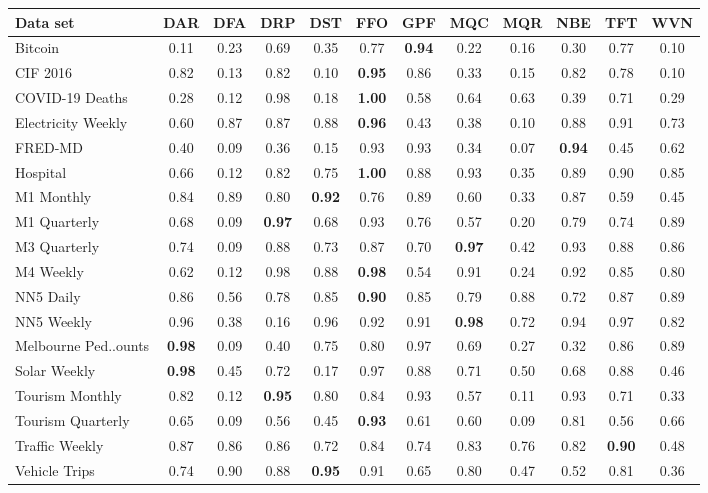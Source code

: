 
    \begin{tabular}{l|ccccccccccc}
        \toprule 
        Data set & DAR & DFA & DRP & DST & FFO & GPF & MQC & MQR & NBE & TFT & WVN \\
        \midrule
        Bitcoin & 0.11 & 0.23 & 0.69 & 0.35 & 0.77 & \textbf{0.94} & 0.22 & 0.16 & 0.30 & 0.77 & 0.10 \\
        CIF 2016 & 0.82 & 0.13 & 0.82 & 0.10 & \textbf{0.95} & 0.86 & 0.33 & 0.15 & 0.82 & 0.78 & 0.10 \\
        COVID-19 Deaths & 0.28 & 0.12 & 0.98 & 0.18 & \textbf{1.00} & 0.58 & 0.64 & 0.63 & 0.39 & 0.71 & 0.29 \\
        Electricity Weekly & 0.60 & 0.87 & 0.87 & 0.88 & \textbf{0.96} & 0.43 & 0.38 & 0.10 & 0.88 & 0.91 & 0.73 \\
        FRED-MD & 0.40 & 0.09 & 0.36 & 0.15 & 0.93 & 0.93 & 0.34 & 0.07 & \textbf{0.94} & 0.45 & 0.62 \\
        Hospital & 0.66 & 0.12 & 0.82 & 0.75 & \textbf{1.00} & 0.88 & 0.93 & 0.35 & 0.89 & 0.90 & 0.85 \\
        M1 Monthly & 0.84 & 0.89 & 0.80 & \textbf{0.92} & 0.76 & 0.89 & 0.60 & 0.33 & 0.87 & 0.59 & 0.45 \\
        M1 Quarterly & 0.68 & 0.09 & \textbf{0.97} & 0.68 & 0.93 & 0.76 & 0.57 & 0.20 & 0.79 & 0.74 & 0.89 \\
        M3 Quarterly & 0.74 & 0.09 & 0.88 & 0.73 & 0.87 & 0.70 & \textbf{0.97} & 0.42 & 0.93 & 0.88 & 0.86 \\
        M4 Weekly & 0.62 & 0.12 & 0.98 & 0.88 & \textbf{0.98} & 0.54 & 0.91 & 0.24 & 0.92 & 0.85 & 0.80 \\
        NN5 Daily & 0.86 & 0.56 & 0.78 & 0.85 & \textbf{0.90} & 0.85 & 0.79 & 0.88 & 0.72 & 0.87 & 0.89 \\
        NN5 Weekly & 0.96 & 0.38 & 0.16 & 0.96 & 0.92 & 0.91 & \textbf{0.98} & 0.72 & 0.94 & 0.97 & 0.82 \\
        Melbourne Ped..ounts & \textbf{0.98} & 0.09 & 0.40 & 0.75 & 0.80 & 0.97 & 0.69 & 0.27 & 0.32 & 0.86 & 0.89 \\
        Solar Weekly & \textbf{0.98} & 0.45 & 0.72 & 0.17 & 0.97 & 0.88 & 0.71 & 0.50 & 0.68 & 0.88 & 0.46 \\
        Tourism Monthly & 0.82 & 0.12 & \textbf{0.95} & 0.80 & 0.84 & 0.93 & 0.57 & 0.11 & 0.93 & 0.71 & 0.33 \\
        Tourism Quarterly & 0.65 & 0.09 & 0.56 & 0.45 & \textbf{0.93} & 0.61 & 0.60 & 0.09 & 0.81 & 0.56 & 0.66 \\
        Traffic Weekly & 0.87 & 0.86 & 0.86 & 0.72 & 0.84 & 0.74 & 0.83 & 0.76 & 0.82 & \textbf{0.90} & 0.48 \\
        Vehicle Trips & 0.74 & 0.90 & 0.88 & \textbf{0.95} & 0.91 & 0.65 & 0.80 & 0.47 & 0.52 & 0.81 & 0.36 \\
        \bottomrule
    \end{tabular}